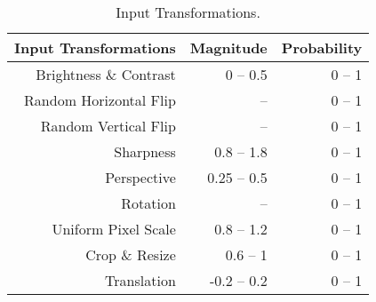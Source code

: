\begin{table}[ht!]
\centering
\renewcommand*{\arraystretch}{1.05}
\caption{Input Transformations.}
\begin{tabular}{r|r|r}
\toprule
\textbf{Input Transformations} &\bf Magnitude &\bf Probability\\
\midrule
Brightness \& Contrast & 0 -- 0.5 & 0 -- 1\\
Random Horizontal Flip & -- & 0 -- 1\\
Random Vertical Flip & -- & 0 -- 1\\
Sharpness & 0.8 -- 1.8 & 0 -- 1 \\
Perspective & 0.25 -- 0.5 & 0 -- 1 \\
Rotation & \textdegree 0 -- \textdegree 180 & 0 -- 1\\
Uniform Pixel Scale & 0.8 -- 1.2 & 0 -- 1 \\
Crop \& Resize & 0.6 -- 1 & 0 -- 1\\
Translation & -0.2 -- 0.2 & 0 -- 1\\
\bottomrule
\end{tabular}
\label{tbl:transforms}
\end{table}



